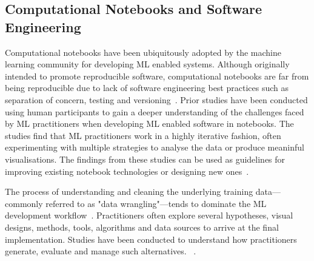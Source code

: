 \documentclass[acmsmall,screen,review,anonymous]{acmart}
\begin{document}
\subsection{Computational Notebooks and Software
  Engineering}\label{sec:notebooks}

Computational notebooks have been ubiquitously adopted by the machine learning community for developing ML enabled systems. Although originally intended to promote reproducible software, computational notebooks are far from being reproducible due to lack of software engineering best practices such as separation of concern, testing and versioning~\cite{pimentel2019large, CITME}. Prior studies have been conducted using human participants to gain a deeper understanding of the challenges faced by ML practitioners when developing ML enabled software in notebooks. The studies find that ML practitioners work in a highly iterative fashion, often experimenting with multiple strategies to analyse the data or produce meaninful visualisations. The findings from these studies can be used as guidelines for improving existing notebook technologies or designing new ones~\cite{kandel2012enterprise, kery2018story, liu2019understanding, chattopadhyay2020wrong}.

The process of understanding and cleaning the underlying training data---commonly referred to as "data wrangling"---tends to dominate the ML development workflow~\cite{CITME}. Practitioners often explore several hypotheses, visual designs, methods, tools, algorithms and data sources to arrive at the final implementation. Studies have been conducted to understand how practitioners generate, evaluate and manage such alternatives. ~\cite{liu2019understanding,kandel2012enterprise}.
\end{document}
